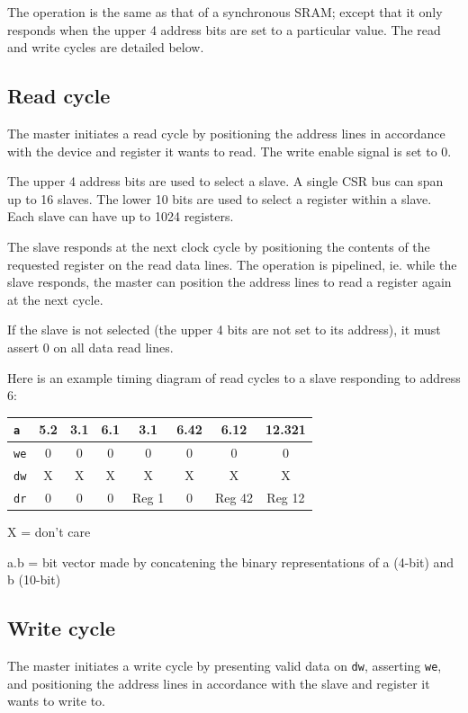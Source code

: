 \documentclass[a4paper,11pt]{article}
\begin{document}
The operation is the same as that of a synchronous SRAM; except that it only responds when the upper 4 address bits are set to a particular value. The read and write cycles are detailed below.

\subsection{Read cycle}
The master initiates a read cycle by positioning the address lines in accordance with the device and register it wants to read. The write enable signal is set to 0.

The upper 4 address bits are used to select a slave. A single CSR bus can span up to 16 slaves. The lower 10 bits are used to select a register within a slave. Each slave can have up to 1024 registers.

The slave responds at the next clock cycle by positioning the contents of the requested register on the read data lines. The operation is pipelined, ie. while the slave responds, the master can position the address lines to read a register again at the next cycle.

If the slave is not selected (the upper 4 bits are not set to its address), it must assert 0 on all data read lines.

Here is an example timing diagram of read cycles to a slave responding to address 6:

\begin{tabular}{|l|c|c|c|c|c|c|c|}
\hline
\verb!a! & 5.2 & 3.1 & 6.1 & 3.1 & 6.42 & 6.12 & 12.321 \\
\hline
\verb!we! & 0 & 0 & 0 & 0 & 0 & 0 & 0 \\
\hline
\verb!dw! & X & X & X & X & X & X & X \\
\hline
\verb!dr! & 0 & 0 & 0 & Reg 1 & 0 & Reg 42 & Reg 12 \\
\hline
\end{tabular}

X = don't care

a.b = bit vector made by concatening the binary representations of a (4-bit) and b (10-bit)

\subsection{Write cycle}
The master initiates a write cycle by presenting valid data on \verb!dw!, asserting \verb!we!, and positioning the address lines in accordance with the slave and register it wants to write to.
\end{document}
